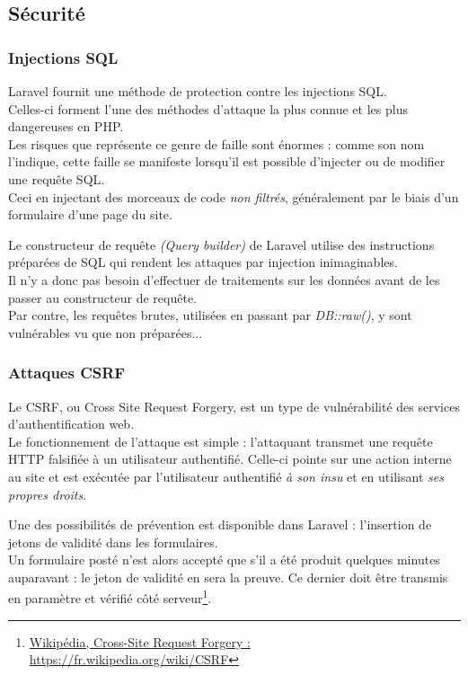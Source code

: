 \newpage

\subsection{Sécurité}
\label{subsec:securite}

\subsubsection{Injections SQL}
\label{sec:injections-sql}
Laravel fournit une méthode de protection contre les injections SQL. \\
Celles-ci forment l'une des méthodes d'attaque la plus connue et les plus dangereuses en PHP. \\
Les risques que représente ce genre de faille sont énormes : comme son nom l'indique, cette faille se manifeste lorsqu'il est possible d'injecter ou de modifier une requête SQL. \\
Ceci en injectant des morceaux de code \textit{non filtrés}, généralement par le biais d'un formulaire d'une page du site.

Le constructeur de requête \textit{(Query builder)} de Laravel utilise des instructions préparées de SQL qui rendent les attaques par injection inimaginables. \\
Il n'y a donc pas besoin d'effectuer de traitements sur les données avant de les passer au constructeur de requête. \\
Par contre, les requêtes brutes, utilisées en passant par \textit{DB::raw()}, y sont vulnérables vu que non préparées...

\subsubsection{Attaques CSRF}
\label{sec:attaques-csrf}
Le CSRF, ou Cross Site Request Forgery, est un type de vulnérabilité des services d'authentification web.\\
Le fonctionnement de l'attaque est simple : l'attaquant transmet une requête HTTP falsifiée à un utilisateur authentifié. Celle-ci pointe sur une action interne au site et est exécutée par l'utilisateur authentifié \textit{à son insu} et en utilisant \textit{ses propres droits}.

Une des possibilités de prévention est disponible dans Laravel : l'insertion de jetons de validité dans les formulaires.\\
Un formulaire posté n'est alors accepté que s'il a été produit quelques minutes auparavant : le jeton de validité en sera la preuve. Ce dernier doit être transmis en paramètre et vérifié côté serveur\footnote{\href{https://fr.wikipedia.org/wiki/CSRF}{Wikipédia, Cross-Site Request Forgery :  https://fr.wikipedia.org/wiki/CSRF}}.
